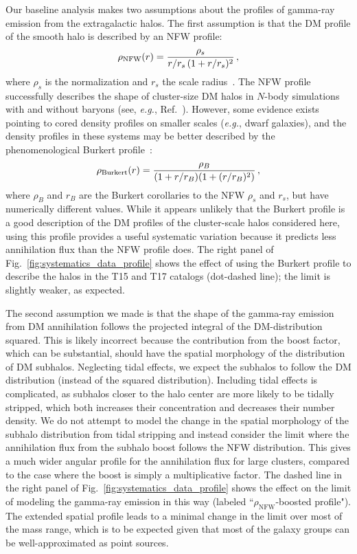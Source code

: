  Our baseline analysis makes two assumptions about the profiles of gamma-ray emission from the extragalactic halos.  The first assumption is that the DM profile of the smooth halo is described by an NFW profile:
\begin{equation}
\rho_{\rm NFW}(r) = \frac{\rho_s}{r/r_s\,(1+r/r_s)^2}\,,
\end{equation}
where $\rho_s$ is the normalization and $r_s$ the scale radius~\cite{Navarro:1996gj}.  The NFW profile successfully describes the shape of cluster-size DM halos in $N$-body simulations with and without baryons (see, {\it e.g.}, Ref.~\cite{Springel:2008cc,Schaller:2014uwa}).  However, some evidence exists pointing to cored density profiles on smaller scales ({\it e.g.}, dwarf galaxies), and the density profiles in these systems may be better described by the phenomenological Burkert profile~\cite{Burkert:1995yz}:
\begin{equation}
\rho_{\rm Burkert}(r) = \frac{\rho_B}{(1+r/r_B)(1+(r/r_B)^2)}\,,
\end{equation}
where $\rho_B$ and $r_B$ are the Burkert corollaries to the NFW $\rho_s$ and $r_s$, but have numerically different values. While it appears unlikely that the Burkert profile is a good description of the DM profiles of the cluster-scale halos considered here, using this profile provides a useful systematic variation because it predicts less annihilation flux than the NFW profile does.  The right panel of Fig.~\ref{fig:systematics_data_profile} shows the effect of using the Burkert profile to describe the halos in the T15 and T17 catalogs (dot-dashed line); the limit is slightly weaker, as expected.

The second assumption we made is that the shape of the gamma-ray emission from DM annihilation follows the projected integral of the DM-distribution squared.  This is likely incorrect because the contribution from the boost factor, which can be substantial, should have the spatial morphology of the distribution of DM subhalos.  Neglecting tidal effects, we expect the subhalos to follow the DM distribution (instead of the squared distribution).  Including tidal effects is complicated, as subhalos closer to the halo center are more likely to be tidally stripped, which both increases their concentration and decreases their number density.  We do not attempt to model the change in the spatial morphology of the subhalo distribution from tidal stripping and instead consider the limit where the annihilation flux from the subhalo boost follows the NFW distribution.  This gives a much wider angular profile for the annihilation flux for large clusters,  compared to the case where the boost is simply a multiplicative factor.  The dashed line in the right panel of Fig.~\ref{fig:systematics_data_profile} shows the effect on the limit of modeling the gamma-ray emission in this way (labeled ``$\rho_\text{NFW}$-boosted profile").  The extended spatial profile leads to a minimal change in the limit over most of the mass range, which is to be expected given that most of the galaxy groups can be well-approximated as point sources.

